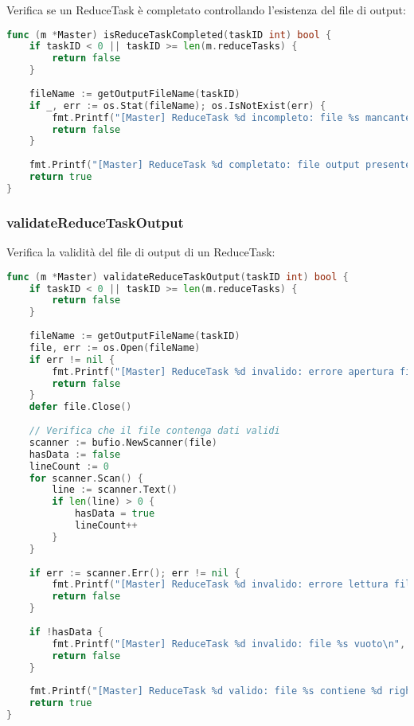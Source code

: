 \documentclass[12pt,a4paper]{article}
\begin{document}
Verifica se un ReduceTask è completato controllando l'esistenza del file di output:

\begin{lstlisting}[language=go]
func (m *Master) isReduceTaskCompleted(taskID int) bool {
    if taskID < 0 || taskID >= len(m.reduceTasks) {
        return false
    }
    
    fileName := getOutputFileName(taskID)
    if _, err := os.Stat(fileName); os.IsNotExist(err) {
        fmt.Printf("[Master] ReduceTask %d incompleto: file %s mancante\n", taskID, fileName)
        return false
    }
    
    fmt.Printf("[Master] ReduceTask %d completato: file output presente\n", taskID)
    return true
}
\end{lstlisting}

\subsubsection{validateReduceTaskOutput}

Verifica la validità del file di output di un ReduceTask:

\begin{lstlisting}[language=go]
func (m *Master) validateReduceTaskOutput(taskID int) bool {
    if taskID < 0 || taskID >= len(m.reduceTasks) {
        return false
    }
    
    fileName := getOutputFileName(taskID)
    file, err := os.Open(fileName)
    if err != nil {
        fmt.Printf("[Master] ReduceTask %d invalido: errore apertura file %s: %v\n", taskID, fileName, err)
        return false
    }
    defer file.Close()
    
    // Verifica che il file contenga dati validi
    scanner := bufio.NewScanner(file)
    hasData := false
    lineCount := 0
    for scanner.Scan() {
        line := scanner.Text()
        if len(line) > 0 {
            hasData = true
            lineCount++
        }
    }
    
    if err := scanner.Err(); err != nil {
        fmt.Printf("[Master] ReduceTask %d invalido: errore lettura file %s: %v\n", taskID, fileName, err)
        return false
    }
    
    if !hasData {
        fmt.Printf("[Master] ReduceTask %d invalido: file %s vuoto\n", taskID, fileName)
        return false
    }
    
    fmt.Printf("[Master] ReduceTask %d valido: file %s contiene %d righe\n", taskID, fileName, lineCount)
    return true
}
\end{lstlisting}
\end{document}
